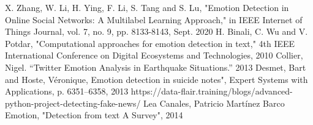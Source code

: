 \documentclass[conference]{IEEEtran}
\begin{document}
\begin{thebibliography}{00}
 X. Zhang, W. Li, H. Ying, F. Li, S. Tang and S. Lu, "Emotion Detection in Online Social Networks: A Multilabel Learning Approach," in IEEE Internet of Things Journal, vol. 7, no. 9, pp. 8133-8143, Sept. 2020
 H. Binali, C. Wu and V. Potdar, "Computational approaches for emotion detection in text," 4th IEEE International Conference on Digital Ecosystems and Technologies, 2010
 Collier, Nigel. “Twitter Emotion Analysis in Earthquake Situations.” 2013
 Desmet, Bart and Hoste, Véronique, Emotion detection in suicide notes", Expert Systems with Applications,
p. 6351–6358, 2013
 https://data-flair.training/blogs/advanced-python-project-detecting-fake-news/
 Lea Canales, Patricio Martínez Barco Emotion, "Detection from text A Survey", 2014
\end{thebibliography}
\end{document}

